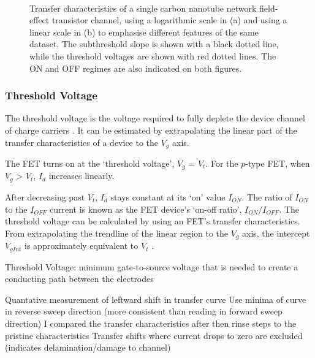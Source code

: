 \documentclass[
  a4paper,
]{scrbook}
\begin{document}
\begin{figure}
\begin{minipage}[t]{0.45\linewidth}
{{}

}

\end{minipage}%
%
\begin{minipage}[t]{0.01\linewidth}

{\centering 

~

}

\end{minipage}%

\caption{\label{fig-literature-characteristics}Transfer characteristics
of a single carbon nanotube network field-effect transistor channel,
using a logarithmic scale in (a) and using a linear scale in (b) to
emphasise different features of the same dataset. The subthreshold slope
is shown with a black dotted line, while the threshold voltages are
shown with red dotted lines. The ON and OFF regimes are also indicated
on both figures.}

\end{figure}

\hypertarget{threshold-voltage}{%
\subsubsection*{Threshold Voltage}\label{threshold-voltage}}

The threshold voltage is the voltage required to fully deplete the
device channel of charge carriers \autocite{Martel1998}. It can be
estimated by extrapolating the linear part of the transfer
characteristics of a device to the \(V_g\) axis.

The FET turns on at the `threshold voltage', \(V_g\) = \(V_t\). For the
\(p\)-type FET, when \(V_g\) \textgreater{} \(V_t\), \(I_d\) increases
linearly.

After decreasing past \(V_t\), \(I_d\) stays constant at its `on' value
\(I_{ON}\). The ratio of \(I_{ON}\) to the \(I_{OFF}\) current is known
as the FET device's `on-off ratio', \(I_{ON}/I_{OFF}\). The threshold
voltage can be calculated by using an FET's transfer characteristics.
From extrapolating the trendline of the linear region to the \(V_g\)
axis, the intercept \(V_{gInt}\) is approximately equivalent to \(V_t\)
\autocite{Sze2006}.

Threshold Voltage: minimum gate-to-source voltage that is needed to
create a conducting path between the electrodes

Quantative measurement of leftward shift in transfer curve Use minima of
curve in reverse sweep direction (more consistent than reading in
forward sweep direction) I compared the transfer characteristics after
then rinse steps to the pristine characteristics Transfer shifts where
current drops to zero are excluded (indicates delamination/damage to
channel)
\end{document}
